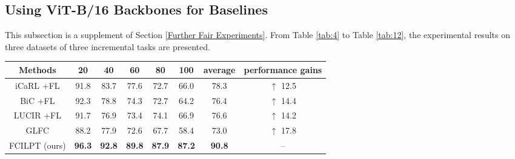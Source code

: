 \documentclass[sigconf,anonymous,review,screen]{acmart}
\begin{document}
\subsection{Using ViT-B/16 Backbones for Baselines} 
This subsection is a supplement of Section \ref{Further Fair Experiments}. From Table \ref{tab:4} to Table \ref{tab:12}, the experimental results on three datasets of three incremental tasks are presented.


%
%
%
%















\begin{table*} \footnotesize
	\centering
	\caption{The experimental results on CIFAR-100 with 5 incremental tasks. Baselines use ViT-B/16 as backbones. }
	\label{tab:4}{
		\begin{tabular}{cccccccc}
			\toprule
			Methods & 20 & 40 & 60 & 80 & 100 & average & performance gains \\
			\midrule
			iCaRL \cite{rebuffi2017icarl}+FL  & 91.8 & 83.7 & 77.6 & 72.7 & 66.0 & 78.3 & $\uparrow$ 12.5  \\
			BiC \cite{wu2019large}+FL & 92.3 & 78.8 & 74.3 & 72.7 & 64.2 & 76.4 & $\uparrow$ 14.4 \\
			LUCIR \cite{hou2019learning}+FL & 91.7 & 76.9 & 73.4 & 74.1 & 66.9 & 76.6 & $\uparrow$ 14.2 \\
			GLFC \cite{dong2022federated} & 88.2 & 77.9 & 72.6 & 67.7 & 58.4 & 73.0 & $\uparrow$ 17.8 \\
			FCILPT (ours) & \textbf{96.3} & \textbf{92.8} & \textbf{89.8} & \textbf{87.9} & \textbf{87.2} & \textbf{90.8} & -- \\
			\bottomrule
	\end{tabular}	}
\end{table*}
\end{document}
